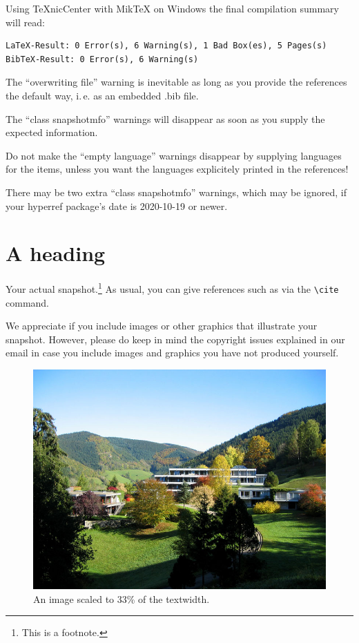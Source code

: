 \documentclass{snapshotmfo}
\begin{document}
Using TeXnicCenter with MikTeX on Windows the final compilation summary will read:
\begin{verbatim}
LaTeX-Result: 0 Error(s), 6 Warning(s), 1 Bad Box(es), 5 Pages(s)
BibTeX-Result: 0 Error(s), 6 Warning(s)
\end{verbatim}

The ``overwriting file'' warning is inevitable as long as you provide the references the default
way, i.\,e. as an embedded .bib file.

The ``class snapshotmfo'' warnings will disappear as soon as you supply the expected information.

Do not make the ``empty language'' warnings disappear by supplying languages for the items,
unless you want the languages explicitely printed in the references!

There may be two extra ``class snapshotmfo'' warnings, which may be ignored, if your hyperref
package's date is 2020-10-19 or newer.

\section[Optional plain text substitute for PDF bookmark]{A heading}
Your actual snapshot.\footnote{This is a footnote.} As usual, you can give references such as \cite{knuth1984texbook, wikiMath, sample13, sample12, sample11, sample14} via the \verb+\cite+ command.

We appreciate if you include images or other graphics that illustrate your snapshot. However, please do keep in mind the copyright issues explained in our email in case you include images and graphics you have not produced yourself.

\begin{figure}[ht]
        \centering
        \includegraphics[width= 0.33 \textwidth]{mfo.jpg}
        \caption{An image scaled to 33\% of the textwidth.}
\label{fig:sample-image}
\end{figure}
\end{document}
